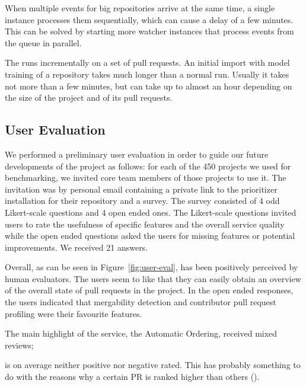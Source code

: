 \documentclass[conference]{IEEEtran}
\begin{document}
When multiple events for big repositories arrive at the same time, a single
\prioritizer instance processes them sequentially, which can cause a delay of a
few minutes. This can be solved by starting more watcher instances that
process events from the queue in parallel.

The \prioritizer runs incrementally on a set of pull requests. An initial import
with model training of a repository takes much longer than a normal run. Usually
it takes not more than a few minutes, but can take up to almost an hour
depending on the size of the project and of its pull requests.

\subsection{User Evaluation}

We performed a preliminary user evaluation in order to guide our future
developments of the project as follows: for each of the 450 projects we used for
benchmarking, we invited core team members of those projects to use it.  The
invitation was by personal email containing a private link to the prioritizer
installation for their repository and a survey. The survey consisted of 4 odd
Likert-scale questions and 4 open ended ones. The Likert-scale questions invited
users to rate the usefulness of specific features and the overall service
quality while the open ended questions asked the users for missing features or
potential improvements. We received 21 answers.

Overall, as can be seen in Figure~\ref{fig:user-eval}, \prioritizer has been
positively perceived by human evaluators. The users seem to like that they
can easily obtain an overview of the overall state of pull requests in the
project. In the open ended responses, the users indicated that mergability
detection and contributor pull request profiling were their favourite
features.


The main highlight of the service, the Automatic Ordering, received mixed
reviews;

is on average neither positive nor negative rated.
This has probably something to do with the reasons why a certain PR is ranked higher than others ().
\end{document}
